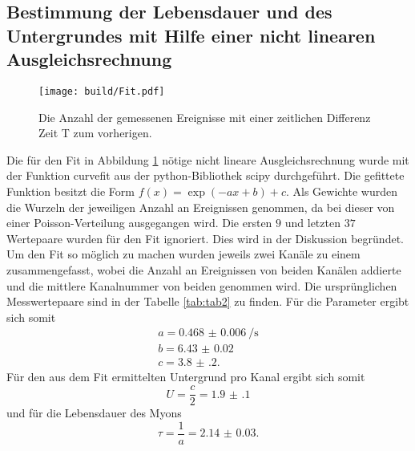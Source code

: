 \subsection{Bestimmung der Lebensdauer und des Untergrundes mit Hilfe einer nicht linearen Ausgleichsrechnung}
\begin{figure}
	\centering
	\texttt{[image: build/Fit.pdf]}
	\caption{Die Anzahl der gemessenen Ereignisse mit einer zeitlichen Differenz Zeit T zum vorherigen.}
	\label{fig:zweite}
\end{figure}
Die für den Fit in Abbildung \ref{fig:zweite} nötige nicht lineare Ausgleichsrechnung wurde mit der Funktion curvefit aus der python-Bibliothek scipy \cite{scipy} durchgeführt. Die gefittete Funktion besitzt die Form $f(x)=\exp(-a x +b)+c$. Als Gewichte wurden die Wurzeln der jeweiligen Anzahl an Ereignissen genommen, da bei dieser von einer Poisson-Verteilung ausgegangen wird. Die ersten $9$ und letzten $37$ Wertepaare wurden für den Fit ignoriert. Dies wird in der Diskussion begründet. Um den Fit so möglich zu machen wurden jeweils zwei Kanäle zu einem zusammengefasst, wobei die Anzahl an Ereignissen von beiden Kanälen addierte und die mittlere Kanalnummer von beiden genommen wird.  Die ursprünglichen Messwertepaare sind in der Tabelle \ref{tab:tab2} zu finden. Für die Parameter ergibt sich somit
\begin{gather*}
a=\SI{0.468(6)}{\per\second}\\
b=\num{6.43(2)}\\
c=\num{3.8(2)}.
\end{gather*}
Für den aus dem Fit ermittelten Untergrund pro Kanal ergibt sich somit
\begin{displaymath}
	U=\frac{c}{2}=\num{1.9(1)}
\end{displaymath}
und für die Lebensdauer des Myons
\begin{displaymath}
	\tau=\frac{1}{a}=\num{2.14(3)}.
\end{displaymath}